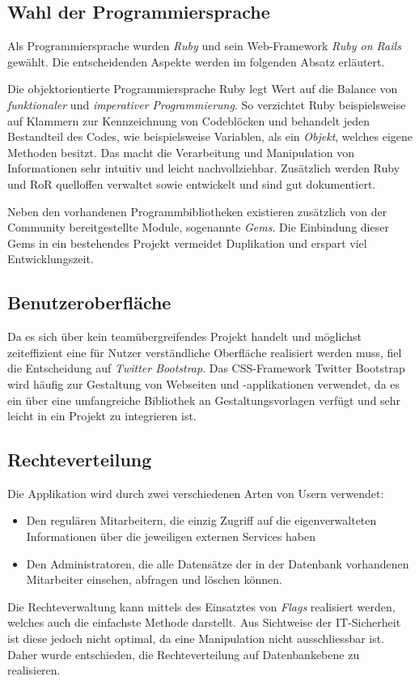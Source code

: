 
\subsection{Wahl der Programmiersprache}
\label{sec:Wahl der Programmiersprache}
Als Programmiersprache wurden \textit{Ruby} und sein Web-Framework \textit{Ruby on Rails} gewählt.
Die entscheidenden Aspekte werden im folgenden Absatz erläutert.

Die objektorientierte Programmiersprache Ruby legt Wert auf die Balance von \textit{funktionaler} und
\textit{imperativer Programmierung}. So verzichtet Ruby beispielsweise auf Klammern zur Kennzeichnung
von Codeblöcken und behandelt jeden Bestandteil des Codes, wie beispielsweise Variablen, als ein \textit{Objekt},
welches eigene Methoden besitzt. Das macht die Verarbeitung und Manipulation von Informationen sehr
intuitiv und leicht nachvollziehbar. Zusätzlich werden Ruby und \acs{RoR}
quelloffen verwaltet sowie entwickelt und sind gut dokumentiert.

Neben den vorhandenen Programmbibliotheken existieren zusätzlich von der Community bereitgestellte Module,
sogenannte \textit{Gems}. Die Einbindung dieser Gems in ein bestehendes Projekt vermeidet
Duplikation und erspart viel Entwicklungszeit.

\subsection{Benutzeroberfläche}
\label{sec:Benutzeroberfläche}
Da es sich über kein teamübergreifendes Projekt handelt und möglichst zeiteffizient
eine für Nutzer verständliche Oberfläche realisiert werden muss, fiel die Entscheidung auf
\textit{Twitter Bootstrap}.
Das CSS-Framework Twitter Bootstrap wird häufig zur Gestaltung von Webseiten und
-applikationen verwendet, da es ein über eine umfangreiche Bibliothek an Gestaltungsvorlagen
verfügt und sehr leicht in ein Projekt zu integrieren ist.

\subsection{Rechteverteilung}
\label{sec:Rechteverteilung}
Die Applikation wird durch zwei verschiedenen Arten von Usern verwendet:
\begin{itemize}
	\item Den regulären Mitarbeitern, die einzig Zugriff auf die eigenverwalteten Informationen über die jeweiligen externen Services haben
	\item Den Administratoren, die alle Datensätze der in der Datenbank vorhandenen Mitarbeiter einsehen, abfragen und löschen können.
\end{itemize}
Die Rechteverwaltung kann mittels des Einsatztes von \textit{Flags} realisiert werden, welches auch die einfachste Methode darstellt. Aus Sichtweise der IT-Sicherheit ist diese jedoch nicht optimal, da eine Manipulation nicht ausschliessbar ist. Daher wurde entschieden, die Rechteverteilung auf
Datenbankebene zu realisieren.

